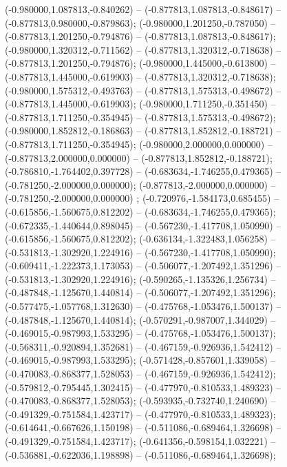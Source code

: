  (-0.980000,1.087813,-0.840262) -- (-0.877813,1.087813,-0.848617) -- (-0.877813,0.980000,-0.879863);
 (-0.980000,1.201250,-0.787050) -- (-0.877813,1.201250,-0.794876) -- (-0.877813,1.087813,-0.848617);
 (-0.980000,1.320312,-0.711562) -- (-0.877813,1.320312,-0.718638) -- (-0.877813,1.201250,-0.794876);
 (-0.980000,1.445000,-0.613800) -- (-0.877813,1.445000,-0.619903) -- (-0.877813,1.320312,-0.718638);
 (-0.980000,1.575312,-0.493763) -- (-0.877813,1.575313,-0.498672) -- (-0.877813,1.445000,-0.619903);
 (-0.980000,1.711250,-0.351450) -- (-0.877813,1.711250,-0.354945) -- (-0.877813,1.575313,-0.498672);
 (-0.980000,1.852812,-0.186863) -- (-0.877813,1.852812,-0.188721) -- (-0.877813,1.711250,-0.354945);
 (-0.980000,2.000000,0.000000) -- (-0.877813,2.000000,0.000000) -- (-0.877813,1.852812,-0.188721);
 (-0.786810,-1.764402,0.397728) -- (-0.683634,-1.746255,0.479365) -- (-0.781250,-2.000000,0.000000);
 (-0.877813,-2.000000,0.000000) -- (-0.781250,-2.000000,0.000000) ;
 (-0.720976,-1.584173,0.685455) -- (-0.615856,-1.560675,0.812202) -- (-0.683634,-1.746255,0.479365);
 (-0.672335,-1.440644,0.898045) -- (-0.567230,-1.417708,1.050990) -- (-0.615856,-1.560675,0.812202);
 (-0.636134,-1.322483,1.056258) -- (-0.531813,-1.302920,1.224916) -- (-0.567230,-1.417708,1.050990);
 (-0.609411,-1.222373,1.173053) -- (-0.506077,-1.207492,1.351296) -- (-0.531813,-1.302920,1.224916);
 (-0.590265,-1.135326,1.256734) -- (-0.487848,-1.125670,1.440814) -- (-0.506077,-1.207492,1.351296);
 (-0.577475,-1.057768,1.312630) -- (-0.475768,-1.053476,1.500137) -- (-0.487848,-1.125670,1.440814);
 (-0.570291,-0.987007,1.344029) -- (-0.469015,-0.987993,1.533295) -- (-0.475768,-1.053476,1.500137);
 (-0.568311,-0.920894,1.352681) -- (-0.467159,-0.926936,1.542412) -- (-0.469015,-0.987993,1.533295);
 (-0.571428,-0.857601,1.339058) -- (-0.470083,-0.868377,1.528053) -- (-0.467159,-0.926936,1.542412);
 (-0.579812,-0.795445,1.302415) -- (-0.477970,-0.810533,1.489323) -- (-0.470083,-0.868377,1.528053);
 (-0.593935,-0.732740,1.240690) -- (-0.491329,-0.751584,1.423717) -- (-0.477970,-0.810533,1.489323);
 (-0.614641,-0.667626,1.150198) -- (-0.511086,-0.689464,1.326698) -- (-0.491329,-0.751584,1.423717);
 (-0.641356,-0.598154,1.032221) -- (-0.536881,-0.622036,1.198898) -- (-0.511086,-0.689464,1.326698);
